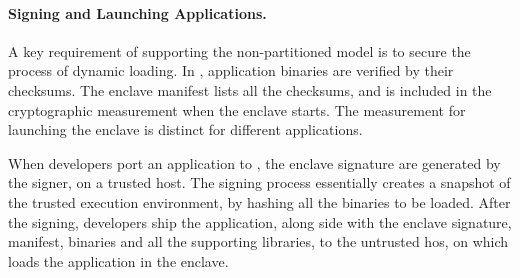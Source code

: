 
\paragraph{Signing and Launching Applications.}
A key requirement of supporting the non-partitioned model is to secure the process of dynamic loading.
In \graphenesgx{}, application binaries are verified by their checksums.
The enclave manifest lists all the checksums,
and is included in the cryptographic measurement when the enclave starts.
The measurement for launching the enclave is distinct
for different applications.

When developers port an application to \graphenesgx{},
the enclave signature are generated by the signer,
on a trusted host.
The signing process essentially creates a snapshot of
the trusted execution environment,
by hashing all the binaries to be loaded.
After the signing, developers ship the application, along side with the enclave signature, manifest, \graphenesgx{} binaries and all the supporting libraries,
to the untrusted hos,
on which \graphenesgx{} loads the application in the enclave.


